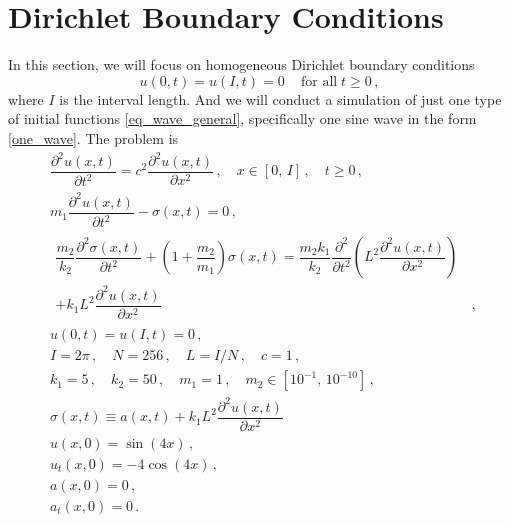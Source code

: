 \documentclass[11pt,a4paper,oneside,openright]{report} %
\begin{document}
\section{Dirichlet Boundary Conditions}
\noindent
In this section, we will focus on homogeneous Dirichlet boundary conditions
\begin{equation}
    u(0, t) = u(I, t) = 0 \, \quad \text{for all} \; t \geq 0 \, ,
\end{equation}
where $I$ is the interval length. And we will conduct a simulation of just one type of initial functions \eqref{eq_wave_general}, specifically one sine wave in the form \eqref{one_wave}. The problem is
\begin{subequations}\label{}
    \begin{align}
        & \dfrac{\partial^2 u (x, t)}{\partial t^2 } = c^2 \dfrac{\partial^2 u (x, t)}{\partial x^2} \, , \quad x \in [0, \, I] \, , \quad t \geq 0 \, , \label{eq_mix_one_dirichlet_1} \\[5pt]
        & m_1 \dfrac{\partial^2 u(x,t)}{\partial t^2} - \sigma(x,t)  = 0 \, , \label{eq_mix_one_dirichlet_2} \\[5pt]
        & \begin{aligned}
            \dfrac{m_2}{k_2} \dfrac{\partial^2 \sigma(x,t)}{\partial t^2}  + \left(1 + \dfrac{m_2}{m_1} \right) \sigma(x,t) = \dfrac{m_2 k_1}{k_2} \dfrac{\partial^2 }{\partial t^2 } \left(L^2 \dfrac{\partial^2 u(x,t)}{\partial x^2} \right) & \\ + k_1 L^2 \dfrac{\partial^2 u(x,t)}{\partial x^2} & \, ,
        \end{aligned}\label{eq_mix_one_dirichlet_3} \\[5pt]
        & u(0, t) = u(I, t) = 0 \, , \label{eq_mix_one_dirichlet_4} \\[5pt]
        & I = 2\pi \, , \quad N = 256 \, , \quad L = I/N \, , \quad c = 1 \, , \label{eq_mix_one_dirichlet_5} \\[5pt]
        & k_1 = 5 \, , \quad k_2 = 50 \, , \quad m_1 = 1 \, , \quad m_2 \in [10^{-1}, \, 10^{-10}] \, , \label{eq_mix_one_dirichlet_6} \\[5pt]
        & \sigma(x,t) \equiv a(x,t) + k_1 L^2 \dfrac{\partial^2 u(x,t)}{\partial x^2} \,  \label{eq_mix_one_dirichlet_7} \\[5pt]
        & u(x,0) = \sin{(4 x)} \, , \label{eq_mix_one_dirichlet_8} \\[5pt]
        & u_t(x,0) =  - 4 \cos{(4x)} \, , \label{eq_mix_one_dirichlet_9} \\[5pt]
        & a(x,0) = 0 \, , \label{eq_mix_one_dirichlet_10} \\[5pt]
        & a_t(x,0) = 0 \, . \label{eq_mix_one_dirichlet_11}
    \end{align}
\end{subequations}
\end{document}
